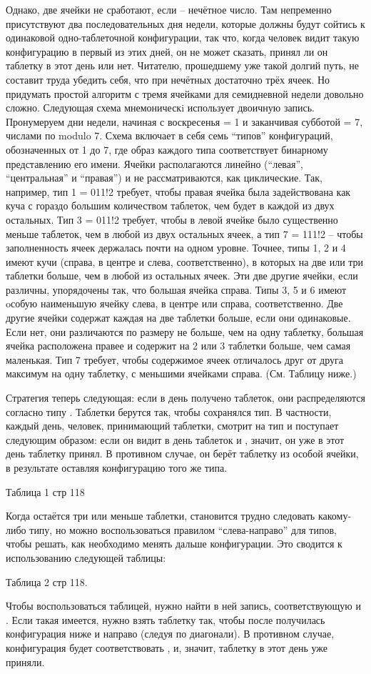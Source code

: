   Однако, две ячейки не сработают, если -- нечётное число. Там непременно присутствуют два последовательных дня недели, которые должны будут сойтись к одинаковой одно-таблеточной конфигурации, так что, когда человек видит такую конфигурацию в первый из этих дней, он не может сказать, принял ли он таблетку в этот день или нет.
  Читателю, прошедшему уже такой долгий путь, не составит труда убедить себя, что  при нечётных  достаточно трёх ячеек. Но придумать простой алгоритм с тремя ячейками для семидневной недели довольно сложно. Следующая схема  мнемоническi использует двоичную запись.
  Пронумеруем дни недели, начиная с воскресенья = 1 и заканчивая субботой = 7, числами по modulo 7. Схема включает в себя семь “типов” конфигураций, обозначенных от 1 до 7, где образ каждого типа соответствует бинарному представлению его имени.
Ячейки располагаются линейно (“левая”, “центральная” и “правая”) и не рассматриваются, как циклические.
   Так, например, тип 1 = 011!2 требует, чтобы правая ячейка была задействована как куча с гораздо большим количеством таблеток, чем будет в каждой из двух остальных. Тип 3 = 011!2 требует, чтобы в левой  ячейке было существенно меньше таблеток, чем в любой из двух остальных ячеек, а тип 7 = 111!2 -- чтобы заполненность ячеек держалась почти на одном уровне.
  Точнее, типы 1, 2 и 4 имеют кучи (справа, в центре и слева, соответственно), в которых на две или три таблетки больше, чем в любой из остальных ячеек. Эти две другие ячейки, если различны, упорядочены так, что большая ячейка справа.
   Типы 3, 5 и 6 имеют oсобую наименьшую ячейку слева, в центре или справа, соответственно. Две другие ячейки содержат каждая на две таблетки больше, если они одинаковые. Если нет, они различаются по размеру не больше, чем на одну таблетку, большая ячейка расположена правее и содержит на 2 или 3 таблетки больше, чем самая маленькая.
  Тип 7 требует, чтобы содержимое ячеек отличалось друг от друга максимум на одну таблетку, с меньшими ячейками справа. (См. Таблицу ниже.)


   Стратегия теперь следующая: если в день получено таблеток, они распределяются согласно типу . Таблетки берутся так, чтобы сохранялся тип.
  В частности, каждый день, человек, принимающий таблетки, смотрит на тип  и поступает следующим образом: если он видит в день таблеток и , значит, он уже в этот день таблетку принял. В противном случае, он берёт таблетку из особой ячейки, в результате оставляя конфигурацию того же типа.
   
                                       Таблица 1 стр 118


  Когда остаётся три или меньше таблетки, становится трудно следовать какому-либо типу, но можно воспользоваться  правилом “слева-направо” для типов, чтобы решать, как необходимо менять дальше конфигурации. Это сводится к использованию следующей таблицы:


                                     Таблица 2 стр 118.


   Чтобы воспользоваться таблицей, нужно найти в ней запись, соответствующую  и . Если такая имеется, нужно взять таблетку так, чтобы после получилась конфигурация ниже и направо (следуя по диагонали). В противном случае, конфигурация будет соответствовать , и, значит,  таблетку в этот день уже приняли.
